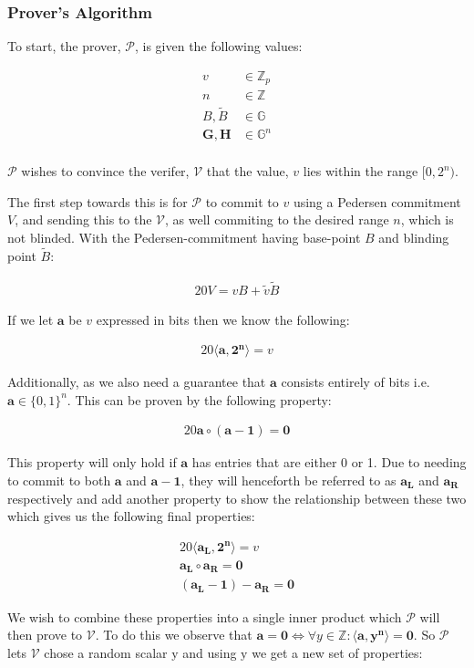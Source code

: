\documentclass{article}
\newcommand{\eq}[1]{\begin{alignat*}{20}#1\end{alignat*}}
\newcommand{\eqn}[2]{\begin{equation}\label{#1}\begin{split}#2\end{split}\end{equation}}
\renewcommand{\vec}[1]{\boldsymbol{#1}}
\newcommand{\ran}[1]{\mathrm{#1}}
\newcommand{\V}{\mathcal{V}}
\renewcommand{\P}{\mathcal{P}}
\newcommand{\G}{\mathbb{G}}
\newcommand{\Z}{\mathbb{Z}}
\newcommand{\dotp}[2]{\langle #1, #2 \rangle}
\newcommand{\opn}[1]{\operatorname{#1}}
\newcommand{\vecl}[1]{\vec{#1_{\opn{L}}}}
\newcommand{\vecr}[1]{\vec{#1_{\opn{R}}}}
\newcommand{\tB}{\widetilde{B}}
\newcommand{\tv}{\widetilde{v}}
\begin{document}
\subsubsection{Prover's Algorithm}\label{prover-range-proofs}

To start, the prover, $\P$, is given the following values:

\eqn{def1}{
	v &\in \Z_p \\
	n &\in \Z\\
	B, \tB &\in \G\\
	\vec{G}, \vec{H} &\in \G^n \\
}

$\P$ wishes to convince the verifer, $\V$ that the value, $v$ lies
within the range $[0,2^n)$.

The first step towards this is for $\P$ to commit to $v$ using
a Pedersen commitment $V$, and sending this to the $\V$, as well
commiting to the desired range $n$, which is not blinded. With the
Pedersen-commitment having base-point $B$ and blinding point $\tB$:

\eq{
	V = vB + \tv \tB
}

If we let $\vec{a}$ be $v$ expressed in bits then we know the following:

\eq{
	\dotp{\vec{a}}{\vec{2^n}} = v
}

Additionally, as we also need a guarantee that $\vec{a}$ consists
entirely of bits i.e. $\vec{a} \in \{0,1\}^n$. This can be
proven by the following property:

\eq{\vec{a}\circ (\vec{a} - \vec{1}) = \vec{0}}

This property will only hold if $\vec{a}$ has entries that are either
0 or 1. Due to needing to commit to both $\vec{a}$ and $\vec{a}
- \vec{1}$, they will henceforth be referred to as $\vecl{a}$
and $\vecr{a}$ respectively and add another property to show the
relationship between these two which gives us the following final
properties:

\eq{
	\dotp{\vecl{a}}{\vec{2^n}} = v \\
	\vecl{a}\circ \vecr{a} = \vec{0} \\
	(\vecl{a} - \vec{1}) - \vecr{a} = \vec{0}
}

We wish to combine these properties into a single inner product which
$\P$ will then prove to $\V$. To do this we observe that $\vec{a}
= \vec{0} \iff \forall y\in\mathbb{Z}: \dotp{\vec{a}}{\vec{y^n}} =
\vec{0}$. So $\P$ lets $\V$ chose a random scalar $\ran{y}$ and using
$\ran{y}$ we get a new set of properties:
\end{document}
